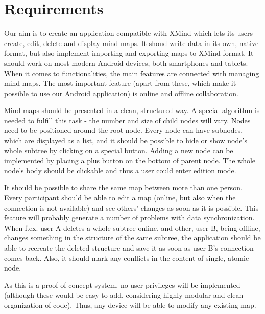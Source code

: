 %
%
%
%
%

\section{Requirements}
\label{sec:requirements}

Our aim is to create an application compatible with XMind which lets its users create, edit, delete and display mind maps. It shoud write data in its own, native format, but also implement importing and exporting maps to XMind format. It should work on most modern Android devices, both smartphones and tablets. When it comes to functionalities, the main features are connected with managing mind maps. The most important feature (apart from these, which make it possible to use our Android application) is online and offline collaboration. 

Mind maps should be presented in a clean, structured way. A special algorithm is needed to fulfill this task - the number and size of child nodes will vary. Nodes need to be positioned around the root node. Every node can have subnodes, which are displayed as a list, and it should be possible to hide or show node's whole subtree by clicking on a special button. Adding a new node can be implemented by placing a plus button on the bottom of parent node. The whole node's body should be clickable and thus a user could enter edition mode.

It should be possible to share the same map between more than one person. Every participant should be able to edit a map (online, but also when the connection is not available) and see others' changes as soon as it is possible. This feature will probably generate a number of problems with data synchronization. When f.ex. user A deletes a whole subtree online, and other, user B, being offline, changes something in the structure of the same subtree, the application should be able to recreate the deleted structure and save it as soon as user B's connection comes back. Also, it should mark any conflicts in the content of single, atomic node. 

As this is a proof-of-concept system, no user privileges will be implemented (although these would be easy to add, considering highly modular and clean organization of code). Thus, any device will be able to modify any existing map.
